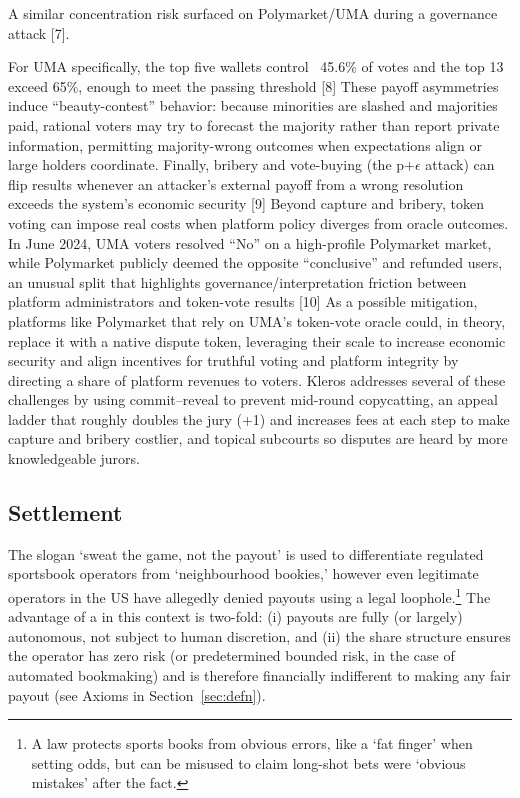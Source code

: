 A similar concentration risk surfaced on Polymarket/UMA during a governance attack [7].

For UMA specifically, the top five wallets control ~45.6\% of votes and the top 13 exceed 65\%, enough to meet the passing threshold [8]
These payoff asymmetries induce “beauty-contest” behavior: because minorities are slashed and majorities paid, rational voters may try to forecast the majority rather than report private information, permitting majority-wrong outcomes when expectations align or large holders coordinate. Finally, bribery and vote-buying (the p+$\epsilon$ attack) can flip results whenever an attacker’s external payoff from a wrong resolution exceeds the system’s economic security [9]
Beyond capture and bribery, token voting can impose real costs when platform policy diverges from oracle outcomes. In June 2024, UMA voters resolved “No” on a high-profile Polymarket market, while Polymarket publicly deemed the opposite “conclusive” and refunded users, an unusual split that highlights governance/interpretation friction between platform administrators and token-vote results [10]
As a possible mitigation, platforms like Polymarket that rely on UMA’s token-vote oracle could, in theory, replace it with a native dispute token, leveraging their scale to increase economic security and align incentives for truthful voting and platform integrity by directing a share of platform revenues to voters.
Kleros addresses several of these challenges by using commit–reveal to prevent mid-round copycatting, an appeal ladder that roughly doubles the jury (+1) and increases fees at each step to make capture and bribery costlier, and topical subcourts so disputes are heard by more knowledgeable jurors.




\subsection{Settlement}\label{wf:clear}

The slogan `sweat the game, not the payout' is used to differentiate regulated sportsbook operators from `neighbourhood bookies,' however even legitimate operators in the US have allegedly denied payouts using a legal loophole.\footnote{A law protects sports books from obvious errors, like a `fat finger' when setting odds, but can be misused to claim long-shot bets were `obvious mistakes' after the fact.} The advantage of a \depm in this context is two-fold: (i) payouts are fully (or largely) autonomous, not subject to human discretion, and (ii) the share structure ensures the operator has zero risk (or predetermined bounded risk, in the case of automated bookmaking) and is therefore financially indifferent to making any fair payout (see Axioms in Section~\ref{sec:defn}).


